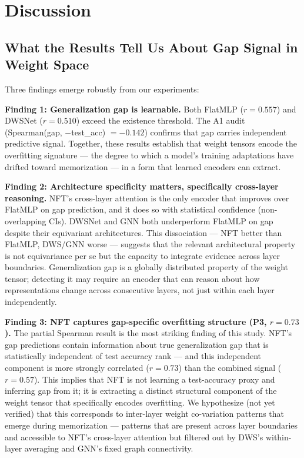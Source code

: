 \section{Discussion}
\label{sec:discussion}

\subsection{What the Results Tell Us About Gap Signal in Weight Space}

Three findings emerge robustly from our experiments:

\textbf{Finding 1: Generalization gap is learnable.} Both FlatMLP ($r = 0.557$) and DWSNet ($r = 0.510$)
exceed the existence threshold. The A1 audit (Spearman(gap, $-$test\_acc) $= -0.142$) confirms that
gap carries independent predictive signal. Together, these results establish that weight tensors
encode the overfitting signature --- the degree to which a model's training adaptations have drifted
toward memorization --- in a form that learned encoders can extract.

\textbf{Finding 2: Architecture specificity matters, specifically cross-layer reasoning.} NFT's cross-layer
attention is the only encoder that improves over FlatMLP on gap prediction, and it does so with
statistical confidence (non-overlapping CIs). DWSNet and GNN both underperform FlatMLP on gap despite
their equivariant architectures. This dissociation --- NFT better than FlatMLP, DWS/GNN worse --- suggests
that the relevant architectural property is not equivariance per se but the capacity to integrate
evidence across layer boundaries. Generalization gap is a globally distributed property of the weight
tensor; detecting it may require an encoder that can reason about how representations change across
consecutive layers, not just within each layer independently.

\textbf{Finding 3: NFT captures gap-specific overfitting structure (P3, $r = 0.73$).} The partial Spearman
result is the most striking finding of this study. NFT's gap predictions contain information about
true generalization gap that is statistically independent of test accuracy rank --- and this independent
component is more strongly correlated ($r = 0.73$) than the combined signal ($r = 0.57$). This implies
that NFT is not learning a test-accuracy proxy and inferring gap from it; it is extracting a distinct
structural component of the weight tensor that specifically encodes overfitting. We hypothesize (not
yet verified) that this corresponds to inter-layer weight co-variation patterns that emerge during
memorization --- patterns that are present across layer boundaries and accessible to NFT's cross-layer
attention but filtered out by DWS's within-layer averaging and GNN's fixed graph connectivity.

